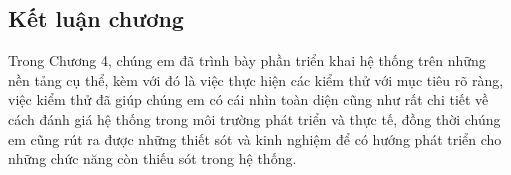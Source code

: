  











  



 








\subsection{Kết luận chương}
  Trong Chương 4, chúng em đã trình bày phần triển khai hệ thống trên những nền tảng cụ thể, kèm với đó là việc thực hiện
  các kiểm thử với mục tiêu rõ ràng, việc kiểm thử đã giúp chúng em có cái nhìn toàn diện cũng như rất chi tiết về cách đánh giá 
  hệ thống trong môi trường phát triển và thực tế, đồng thời chúng em cũng rút ra được những thiết sót và kinh nghiệm
  để có hướng phát triển cho những chức năng còn thiếu sót trong hệ thống.
\newpage
